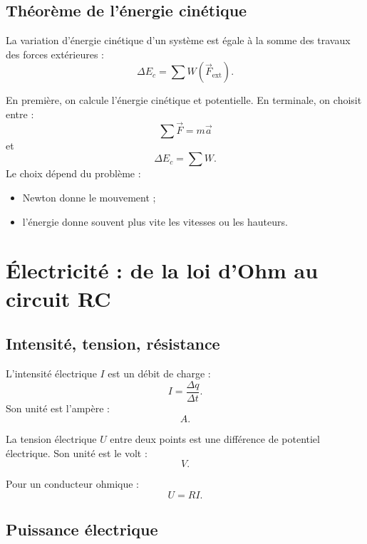 \documentclass[11pt,a4paper]{article}
\begin{document}
\subsection{Théorème de l'énergie cinétique}

\begin{propriete}
La variation d'énergie cinétique d'un système est égale à la somme des travaux des forces extérieures :
\[
\Delta E_c=\sum W(\vec F_{\text{ext}}).
\]
\end{propriete}

\begin{transition}
En première, on calcule l'énergie cinétique et potentielle.  
En terminale, on choisit entre :
\[
\sum \vec F=m\vec a
\]
et
\[
\Delta E_c=\sum W.
\]
Le choix dépend du problème :
\begin{itemize}
  \item Newton donne le mouvement ;
  \item l'énergie donne souvent plus vite les vitesses ou les hauteurs.
\end{itemize}
\end{transition}

\section{Électricité : de la loi d'Ohm au circuit RC}

\subsection{Intensité, tension, résistance}

\begin{definition}
L'intensité électrique $I$ est un débit de charge :
\[
I=\frac{\Delta q}{\Delta t}.
\]
Son unité est l'ampère :
\[
\si{A}.
\]
\end{definition}

\begin{definition}
La tension électrique $U$ entre deux points est une différence de potentiel électrique.  
Son unité est le volt :
\[
\si{V}.
\]
\end{definition}

\begin{propriete}
Pour un conducteur ohmique :
\[
U=RI.
\]
\end{propriete}

\subsection{Puissance électrique}
\end{document}
